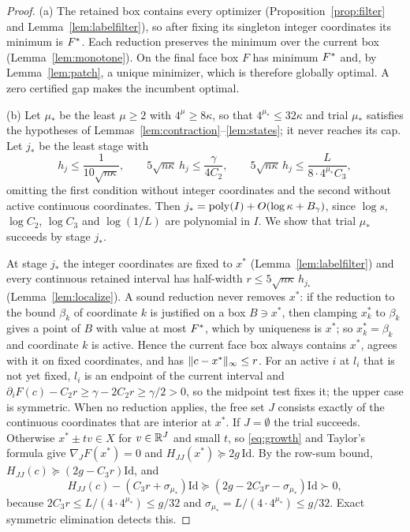 \begin{proof}
(a) The retained box contains every optimizer
(Proposition~\ref{prop:filter} and Lemma~\ref{lem:labelfilter}), so after
fixing its singleton integer coordinates its minimum is $F^*$. Each
reduction preserves the minimum over the current box
(Lemma~\ref{lem:monotone}). On the final face box $F$ has minimum $F^*$ and,
by Lemma~\ref{lem:patch}, a unique minimizer, which is therefore globally
optimal. A zero certified gap makes the incumbent optimal.

(b) Let $\mu_*$ be the least $\mu\ge2$ with $4^\mu\ge8\kappa$, so that
$4^{\mu_*}\le32\kappa$ and trial $\mu_*$ satisfies the hypotheses of
Lemmas~\ref{lem:contraction}--\ref{lem:states}; it never reaches its cap. Let
$j_*$ be the least stage with
\[
h_j\le\frac1{10\sqrt{n\kappa}},\qquad
5\sqrt{n\kappa}\,h_j\le\frac\gamma{4C_2},\qquad
5\sqrt{n\kappa}\,h_j\le\frac L{8\cdot4^{\mu_*}C_3},
\]
omitting the first condition without integer coordinates and the second
without active continuous coordinates. Then
$j_*=\operatorname{poly}(I)+O(\log\kappa+B_\gamma)$, since $\log s$, $\log C_2$, $\log C_3$
and $\log(1/L)$ are polynomial in $I$. We show that trial $\mu_*$ succeeds by
stage $j_*$.

At stage $j_*$ the integer coordinates are fixed to $x^*$
(Lemma~\ref{lem:labelfilter}) and every continuous retained interval has
half-width $r\le5\sqrt{n\kappa}\,h_{j_*}$ (Lemma~\ref{lem:localize}). A sound
reduction never removes $x^*$: if the reduction to the bound $\beta_k$ of
coordinate $k$ is justified on a box $B\ni x^*$, then clamping $x^*_k$ to
$\beta_k$ gives a point of $B$ with value at most $F^*$, which by uniqueness is
$x^*$; so $x^*_k=\beta_k$ and coordinate $k$ is active. Hence the current
face box always contains $x^*$, agrees with it on fixed coordinates, and has
$\lVert c-x^*\rVert_\infty\le r$. For an active $i$ at $l_i$ that is not yet fixed,
$l_i$ is an endpoint of the current interval and
$\partial_iF(c)-C_2r\ge\gamma-2C_2r\ge\gamma/2>0$, so the midpoint test
fixes it; the upper case is symmetric. When no reduction applies, the free
set $J$ consists exactly of the continuous coordinates that are interior at
$x^*$. If $J=\emptyset$ the trial succeeds. Otherwise $x^*\pm tv\in X$ for
$v\in\mathbb R^J$ and small $t$, so \eqref{eq:growth} and Taylor's formula give
$\nabla_JF(x^*)=0$ and $H_{JJ}(x^*)\succeq2g\,\mathrm{Id}$. By the row-sum
bound, $H_{JJ}(c)\succeq(2g-C_3r)\mathrm{Id}$, and
\[
H_{JJ}(c)-(C_3r+\sigma_{\mu_*})\mathrm{Id}\succeq(2g-2C_3r-\sigma_{\mu_*})\mathrm{Id}
\succ0,
\]
because $2C_3r\le L/(4\cdot4^{\mu_*})\le g/32$ and
$\sigma_{\mu_*}=L/(4\cdot4^{\mu_*})\le g/32$. Exact symmetric elimination
detects this.


\end{proof}

